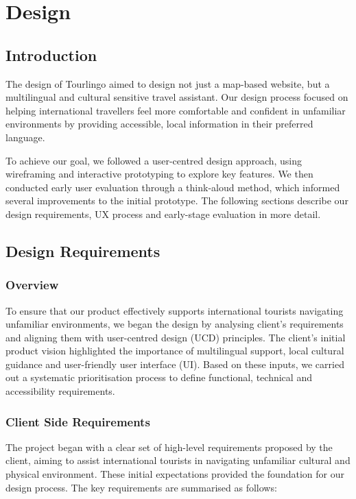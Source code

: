 \chapter{Design}

\section{Introduction}

The design of Tourlingo aimed to design not just a map-based website, but a multilingual and cultural sensitive travel assistant. Our design process focused on helping international travellers feel more comfortable and confident in unfamiliar environments by providing accessible, local information in their preferred language.

To achieve our goal, we followed a user-centred design approach, using wireframing and interactive prototyping to explore key features. We then conducted early user evaluation through a think-aloud method, which informed several improvements to the initial prototype. The following sections describe our design requirements, UX process and early-stage evaluation in more detail.

\section{Design Requirements}

\subsection{Overview}
To ensure that our product effectively supports international tourists navigating unfamiliar environments, we began the design by analysing client's requirements and aligning them with user-centred design (UCD) principles. The client's initial product vision highlighted the importance of multilingual support, local cultural guidance and user-friendly user interface (UI). Based on these inputs, we carried out a systematic prioritisation process to define functional, technical and accessibility requirements.

\subsection{Client Side Requirements}
The project began with a clear set of high-level requirements proposed by the client, aiming to assist international tourists in navigating unfamiliar cultural and physical environment. These initial expectations provided the foundation for our design process. The key requirements are summarised as follows:

